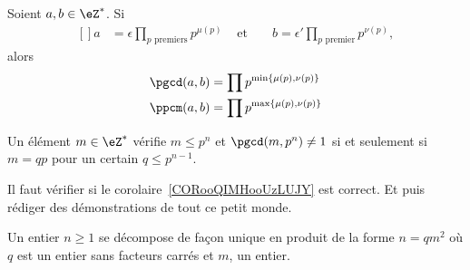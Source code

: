 \begin{proposition}     \label{PROPooNQBOooHWqTvs}
    Soient \( a,b\in\eZ^*\). Si
    \begin{equation}
        \begin{aligned}[]
            a&=\epsilon\prod_{ p\text{ premiers}}p^{\mu(p)}&\text{ et }&&b=\epsilon'\prod_{ p\text{ premier}}p^{\nu(p)},
        \end{aligned}
    \end{equation}
    alors
    \begin{subequations}
        \begin{align}
            \pgcd(a,b)&=\prod p^{\min\{ \mu(p),\nu(p) \}}\\
            \ppcm(a,b)&=\prod p^{\max\{ \mu(p),\nu(p) \}}
        \end{align}
    \end{subequations}
\end{proposition}

\begin{corollary}  \label{CORooQIMHooUzLUJY}
    Un élément \( m\in \eZ^*\) vérifie \( m\leq p^n\) et \( \pgcd(m,p^n)\neq 1\) si et seulement si \( m=qp\) pour un certain \( q\leq p^{n-1}\).
\end{corollary}

\begin{probleme}
   Il faut vérifier si le corolaire~\ref{CORooQIMHooUzLUJY} est correct.
   Et puis rédiger des démonstrations de tout ce petit monde.
\end{probleme}

\begin{lemma}   \label{LemheKdsa}
    Un entier \( n\geq 1\) se décompose de façon unique en produit de la forme \( n=qm^2\) où \( q\) est un entier sans facteurs carrés et \( m\), un entier.
\end{lemma}

